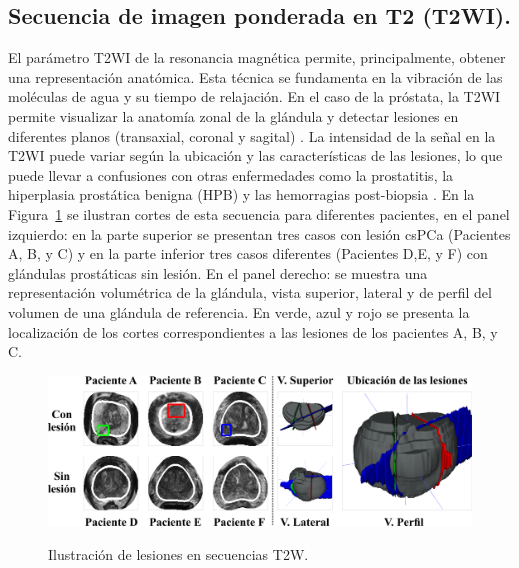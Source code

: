 \subsection{Secuencia de imagen ponderada en T2 (T2WI). }El parámetro T2WI de la resonancia magnética permite,  principalmente, obtener una representación anatómica. Esta técnica se fundamenta en la vibración de las moléculas de agua y su tiempo de relajación. En el caso de la próstata, la T2WI permite visualizar la anatomía zonal de la glándula y detectar lesiones en diferentes planos (transaxial, coronal y sagital) . La intensidad de la señal en la T2WI puede variar según la ubicación y las características de las lesiones, lo que puede llevar a confusiones con otras enfermedades como la prostatitis, la hiperplasia prostática benigna (HPB) y las hemorragias post-biopsia . En la 
Figura~\ref{fig:axT2W} se ilustran cortes de esta secuencia para diferentes pacientes, en el panel izquierdo: en la parte superior se presentan tres casos con lesión csPCa (Pacientes A, B, y C) y en la parte inferior tres casos diferentes (Pacientes D,E, y F) con glándulas prostáticas sin lesión. En el panel derecho: se muestra una representación 
volumétrica de la glándula, 
vista superior, lateral y de perfil del volumen de una glándula de referencia. En verde, azul y rojo se presenta la localización de los cortes correspondientes a las lesiones de los pacientes A, B, y C.\par


\begin{figure}[h!]
\centering
\caption{Ilustración de lesiones en secuencias T2W.}
\includegraphics[width=1\textwidth]{imgs/T2WSUMUP.png}
\label{fig:axT2W}
\end{figure}

